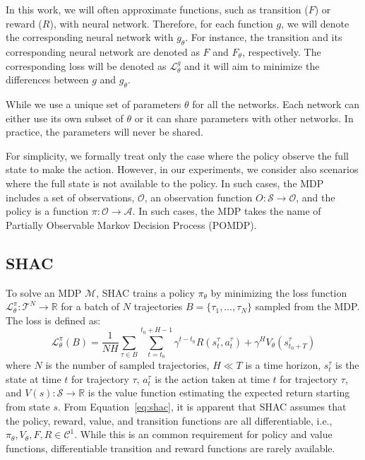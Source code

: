 In this work, we will often approximate functions, such as transition ($F$) or reward ($R$), with neural network. Therefore, for each function $g$, we will denote the corresponding neural network with $g_\theta$. For instance, the transition and its corresponding neural network are denoted as $F$ and $F_{\theta}$, respectively. The corresponding loss will be denoted as $\mathcal{L}_\theta^g$ and it will aim to minimize the differences between $g$ and $g_\theta$.

While we use a unique set of parameters $\theta$ for all the networks. Each network can either use its own subset of $\theta$ or it can share parameters with other networks. In practice, the parameters will never be shared.

For simplicity, we formally treat only the case where the policy observe the full state to make the action. However, in our experiments, we consider also scenarios where the full state is not available to the policy. In such cases, the MDP includes a set of observations, $\mathcal{O}$, an observation function $O:\mathcal{S}\rightarrow\mathcal{O}$, and the policy is a function $\pi:\mathcal{O}\rightarrow\mathcal{A}$. In such cases, the MDP takes the name of Partially Observable Markov Decision Process (POMDP). 

\subsection{SHAC}

To solve an MDP $\mathcal{M}$, SHAC trains a policy $\pi_\theta$ by minimizing the loss function $\mathcal{L}_\theta^{\pi}:\mathcal{T}^N\rightarrow\mathbb{R}$ for a batch of $N$ trajectories $B = \{\tau_1, \ldots, \tau_N\}$ sampled from the MDP. The loss is defined as:  
\begin{equation}\label{eq:shac}
    \mathcal{L}_\theta^{\pi}(B) = \frac{1}{NH}\sum_{\tau\in B} \sum_{t=t_0}^{t_0+H-1} \gamma^{t-t_0} R(s_t^\tau, a_t^\tau) + \gamma^H V_\theta(s^\tau_{t_0+T})
\end{equation}
where $N$ is the number of sampled trajectories, $H \ll T$ is a time horizon, $s_t^\tau$ is the state at time $t$ for trajectory $\tau$, $a_t^\tau$ is the action taken at time $t$ for trajectory $\tau$, and $V(s): \mathcal{S} \rightarrow \mathbb{R}$ is the value function estimating the expected return starting from state $s$. From Equation~\ref{eq:shac}, it is apparent that SHAC assumes that the policy, reward, value, and transition functions are all differentiable, i.e., $\pi_\theta,V_\theta,F,R \in \mathcal{C}^1$. While this is an common requirement for policy and value functions, differentiable transition and reward functions are rarely available. 

